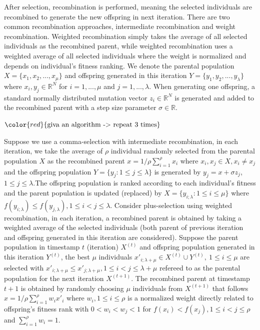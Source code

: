 After selection, recombination is performed, meaning the selected individuals are recombined to generate the new offspring in next iteration. There are two common recombination approaches, intermediate recombination and weight recombination. Weighted recombination simply takes the average of all selected individuals as the recombined parent, while weighted recombination uses a weighted average of all selected individuals where the weight is normalized and depends on individual's fitness ranking. We denote the parental population $X = \{x_1,x_2,...,x_\mu\}$ and offspring generated in this iteration $Y = \{y_1,y_2,...,y_{\lambda} \}$ where $x_i,y_j \in \mathbb{R}^N$ for $i=1,...,\mu$ and $j=1,...,\lambda$. When generating one offspring, a standard normally distributed mutation vector $z_i \in \mathbb{R}^N $ is generated and added to the recombined parent with a step size parameter $\sigma \in \mathbb{R}$.  

$\color{red}{\text{giva an algorithm -> repeat 3 times}}$

Suppose we use a comma-selection with intermediate recombination, in each iteration, we take the average of $\rho$ individual randomly selected from the parental population $X$ as the recombined parent $x = 1/\rho \sum_{i=1}^{\rho}x_i$ where $x_i,x_j \in X, x_i \neq x_j$ and the offspring population $Y = \{y_j: 1 \leq j \leq \lambda\}$ is generated by  $y_j = x + \sigma z_j$, $1 \leq j \leq \lambda$.The offspring population is ranked according to each individual's fitness and the parent population is updated (replaced) by $X = \{ y_{i;\lambda}:1 \leq i \leq \mu \}$ where $f(y_{i;\lambda}) \leq f(y_{j,\lambda}), 1 \leq i < j \leq \lambda$. Consider plus-selection using weighted recombination, in each iteration, a recombined parent is obtained by taking a weighted average of the selected individuals (both parent of previous iteration and offspring generated in this iteration are considered). Suppose the parent population in timestamp $t$ (iteration) $X^{(t)}$ and offspring population generated in this iteration $Y^{(t)}$, the best $\mu$ individuals $x \prime_{i;\lambda+\mu} \in X^{(t)} \cup Y^{(t)},\  1 \leq i \leq \mu$ are selected with $ x \prime_{i;\lambda+\mu} \leq x \prime_{j;\lambda+\mu}, 1 \leq i < j \leq \lambda+\mu $ refereed to as the parental population for the next iteration $X^{(t+1)}$. The recombined parent at timestamp $t+1$ is obtained by randomly choosing $\mu$ individuals from $X^{(t+1)}$ that follows $x = 1/\rho \sum_{i=1}^{\rho} w_i x \prime _i$ where $w_i, 1 \leq i \leq \rho$ is a normalized weight directly related to offspring's fitness rank with $0 < w_i < w_j < 1$ for $f(x_i) < f(x_j),1 \leq i < j  \leq \rho$ and $\sum_{i=1}^\rho w_i = 1$.

